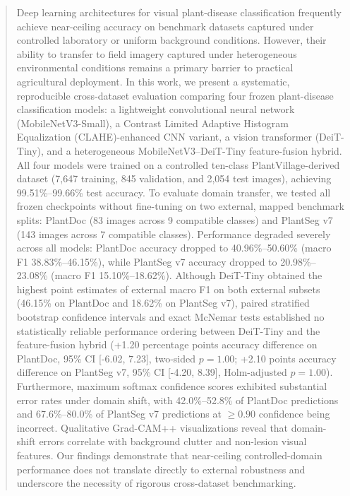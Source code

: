 \documentclass[10pt,journal,compsoc]{IEEEtran}
\begin{document}
\begin{abstract}
Deep learning architectures for visual plant-disease classification frequently achieve near-ceiling accuracy on benchmark datasets captured under controlled laboratory or uniform background conditions. However, their ability to transfer to field imagery captured under heterogeneous environmental conditions remains a primary barrier to practical agricultural deployment. In this work, we present a systematic, reproducible cross-dataset evaluation comparing four frozen plant-disease classification models: a lightweight convolutional neural network (MobileNetV3-Small), a Contrast Limited Adaptive Histogram Equalization (CLAHE)-enhanced CNN variant, a vision transformer (DeiT-Tiny), and a heterogeneous MobileNetV3--DeiT-Tiny feature-fusion hybrid. All four models were trained on a controlled ten-class PlantVillage-derived dataset (7,647 training, 845 validation, and 2,054 test images), achieving 99.51\%--99.66\% test accuracy. To evaluate domain transfer, we tested all frozen checkpoints without fine-tuning on two external, mapped benchmark splits: PlantDoc (83 images across 9 compatible classes) and PlantSeg v7 (143 images across 7 compatible classes). Performance degraded severely across all models: PlantDoc accuracy dropped to 40.96\%--50.60\% (macro F1 38.83\%--46.15\%), while PlantSeg v7 accuracy dropped to 20.98\%--23.08\% (macro F1 15.10\%--18.62\%). Although DeiT-Tiny obtained the highest point estimates of external macro F1 on both external subsets (46.15\% on PlantDoc and 18.62\% on PlantSeg v7), paired stratified bootstrap confidence intervals and exact McNemar tests established no statistically reliable performance ordering between DeiT-Tiny and the feature-fusion hybrid (+1.20 percentage points accuracy difference on PlantDoc, 95\% CI [-6.02, 7.23], two-sided $p=1.00$; +2.10 points accuracy difference on PlantSeg v7, 95\% CI [-4.20, 8.39], Holm-adjusted $p=1.00$). Furthermore, maximum softmax confidence scores exhibited substantial error rates under domain shift, with 42.0\%--52.8\% of PlantDoc predictions and 67.6\%--80.0\% of PlantSeg v7 predictions at $\ge 0.90$ confidence being incorrect. Qualitative Grad-CAM++ visualizations reveal that domain-shift errors correlate with background clutter and non-lesion visual features. Our findings demonstrate that near-ceiling controlled-domain performance does not translate directly to external robustness and underscore the necessity of rigorous cross-dataset benchmarking.
\end{abstract}
\end{document}
